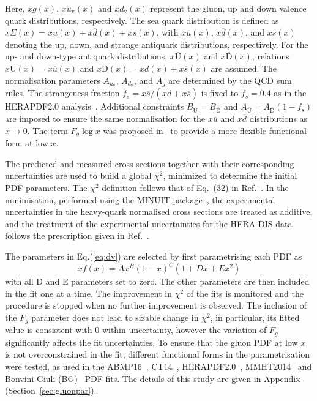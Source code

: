 \documentclass[12pt]{article}
\begin{document}
Here, $xg(x)$, $xu_{\mathrm{v}}(x)$ and $xd_{\mathrm{v}}(x)$ represent the gluon, up and down valence quark distributions, respectively. The sea quark distribution is defined as $x\Sigma(x)=x\overline{u}(x)+x\overline{d}(x)+x\overline{s}(x)$, with $x\overline{u}(x)$, $x\overline{d}(x)$, and $x\overline{s}(x)$ denoting the up, down, and strange antiquark distributions, respectively.
For the up- and down-type antiquark distributions, $x\overline{\mathrm{U}}(x)$ and $x\overline{\mathrm{D}}(x)$, relations $x\overline{\mathrm{U}}(x) = x\overline{u}(x)$ and $x\overline{\mathrm{D}}(x) = x\overline{d}(x) + x\overline{s}(x)$  are assumed.
The normalisation parameters $A_{u_{\mathrm{v}}}$, $A_{d_\mathrm{v}}$, and $A_{g}$ are determined by the QCD sum rules.
The strangeness fraction $f_{s} = x\overline{s}/( x\overline{d} + x\overline{s})$ is fixed to
$f_{s}=0.4$ as in the HERAPDF2.0 analysis~\cite{Abramowicz:2015mha}.
Additional constraints $B_{\overline{\mathrm{U}}} = B_{\overline{\mathrm{D}}}$ and $A_{\overline{\mathrm{U}}} = A_{\overline{\mathrm{D}}}(1 - f_{s})$ are imposed to ensure the same normalisation for the $x\overline{u}$ and $x\overline{d}$ distributions as $x \to 0$.
The term $F_g\log x$ was proposed in~\cite{Bonvini:2019wxf} to provide a more flexible functional form at low $x$.

The predicted and measured cross sections together with their corresponding uncertainties are used to build a global $\chi^2$, minimized to determine the initial PDF
parameters. The $\chi^2$ definition follows that of Eq.~(32) in Ref.~\cite{Abramowicz:2015mha}. In the minimisation, performed 
using the MINUIT package~\cite{James:1975dr}, the experimental uncertainties in the heavy-quark normalised cross 
sections are treated as additive, and the treatment of the experimental uncertainties for the HERA DIS data follows 
the prescription given in Ref.~\cite{Abramowicz:2015mha}.

The parameters in Eq.(\ref{eq:dv}) are selected by first parametrising each PDF as
\begin{equation}
xf(x) = Ax^B(1-x)^C(1+Dx+Ex^2)
\label{eq:de}
\end{equation}
with all D and E parameters set to zero. The other 
parameters are then included in the fit one at a time. The improvement in $\chi^2$ of the fits is monitored and the 
procedure is stopped when no further improvement is observed. The inclusion of the $F_{g}$ parameter does not lead to sizable change in $\chi^2$, in particular, its fitted value is consistent with $0$ within uncertainty, however the variation of $F_{g}$ significantly affects the fit uncertainties.
To ensure that the gluon PDF at low $x$ is not overconstrained in the fit, different functional forms in the parametrisation were tested, as used in the ABMP16~\cite{Alekhin:2017kpj}, CT14~\cite{Dulat:2015mca}, HERAPDF2.0~\cite{Abramowicz:2015mha}, MMHT2014~\cite{Harland-Lang:2014zoa} and Bonvini-Giuli (BG)~\cite{Bonvini:2019wxf} PDF fits. The details of this study are given in Appendix (Section~\ref{sec:gluonpar}).
\end{document}
